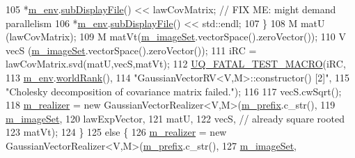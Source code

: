 \begin{DoxyCode}
105       *\hyperlink{class_q_u_e_s_o_1_1_base_vector_r_v_a556761c50e2d171977ef5f19a63c8c73}{m\_env}.\hyperlink{class_q_u_e_s_o_1_1_base_environment_a8a0064746ae8dddfece4229b9ad374d6}{subDisplayFile}() << lawCovMatrix; \textcolor{comment}{// FIX ME: might demand parallelism}
106       *\hyperlink{class_q_u_e_s_o_1_1_base_vector_r_v_a556761c50e2d171977ef5f19a63c8c73}{m\_env}.\hyperlink{class_q_u_e_s_o_1_1_base_environment_a8a0064746ae8dddfece4229b9ad374d6}{subDisplayFile}() << std::endl;
107     \}
108     M matU (lawCovMatrix);
109     M matVt(\hyperlink{class_q_u_e_s_o_1_1_base_vector_r_v_ad31872bb4da22d47528cb9d691b3b7ff}{m\_imageSet}.vectorSpace().zeroVector());
110     V vecS (\hyperlink{class_q_u_e_s_o_1_1_base_vector_r_v_ad31872bb4da22d47528cb9d691b3b7ff}{m\_imageSet}.vectorSpace().zeroVector());
111     iRC = lawCovMatrix.svd(matU,vecS,matVt);
112     \hyperlink{_defines_8h_a56d63d18d0a6d45757de47fcc06f574d}{UQ\_FATAL\_TEST\_MACRO}(iRC,
113                         \hyperlink{class_q_u_e_s_o_1_1_base_vector_r_v_a556761c50e2d171977ef5f19a63c8c73}{m\_env}.\hyperlink{class_q_u_e_s_o_1_1_base_environment_a78b57112bbd0e6dd0e8afec00b40ffa7}{worldRank}(),
114                         \textcolor{stringliteral}{"GaussianVectorRV<V,M>::constructor() [2]"},
115             \textcolor{stringliteral}{"Cholesky decomposition of covariance matrix failed."});
116 
117     vecS.cwSqrt();
118     \hyperlink{class_q_u_e_s_o_1_1_base_vector_r_v_ad99bc05293c0fd0a0accb3191fb7119e}{m\_realizer} = \textcolor{keyword}{new} GaussianVectorRealizer<V,M>(\hyperlink{class_q_u_e_s_o_1_1_base_vector_r_v_a030ce3bc9873a9eaf6d8bf452c096ab3}{m\_prefix}.c\_str(),
119                                                         \hyperlink{class_q_u_e_s_o_1_1_base_vector_r_v_ad31872bb4da22d47528cb9d691b3b7ff}{m\_imageSet},
120                                                         lawExpVector,
121                                                         matU,
122                                                         vecS, \textcolor{comment}{// already square rooted}
123                                                         matVt);
124   \}
125   \textcolor{keywordflow}{else} \{
126     \hyperlink{class_q_u_e_s_o_1_1_base_vector_r_v_ad99bc05293c0fd0a0accb3191fb7119e}{m\_realizer} = \textcolor{keyword}{new} GaussianVectorRealizer<V,M>(\hyperlink{class_q_u_e_s_o_1_1_base_vector_r_v_a030ce3bc9873a9eaf6d8bf452c096ab3}{m\_prefix}.c\_str(),
127                                                         \hyperlink{class_q_u_e_s_o_1_1_base_vector_r_v_ad31872bb4da22d47528cb9d691b3b7ff}{m\_imageSet},

\end{DoxyCode}
